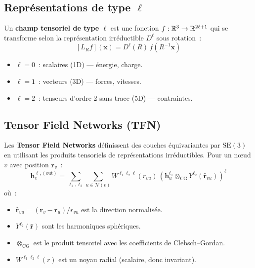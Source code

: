 \subsection{Repr\'esentations de type $\ell$}

\begin{definition}
Un \textbf{champ tensoriel de type $\ell$} est une fonction
$f: \mathbb{R}^3 \to \mathbb{R}^{2\ell+1}$ qui se transforme selon la repr\'esentation
irr\'eductible $D^\ell$ sous rotation~:
\[
    [L_R f](\mathbf{x}) = D^\ell(R)\, f(R^{-1}\mathbf{x})
\]
\begin{itemize}
    \item $\ell = 0$~: scalaires (1D) --- \'energie, charge.
    \item $\ell = 1$~: vecteurs (3D) --- forces, vitesses.
    \item $\ell = 2$~: tenseurs d'ordre 2 sans trace (5D) --- contraintes.
\end{itemize}
\end{definition}

\subsection{Tensor Field Networks (TFN)}

\begin{definition}
Les \textbf{Tensor Field Networks} d\'efinissent des couches \'equivariantes
par $\mathrm{SE}(3)$ en utilisant les produits tensoriels de repr\'esentations
irr\'eductibles. Pour un n\oe ud $v$ avec position $\mathbf{r}_v$~:
\[
    \mathbf{h}_v^{\ell, (\text{out})} = \sum_{\ell_1, \ell_2}
    \sum_{u \in \mathcal{N}(v)} W^{\ell_1 \ell_2 \ell}(r_{vu})\,
    \left(\mathbf{h}_u^{\ell_1} \otimes_{\text{CG}} Y^{\ell_2}(\hat{\mathbf{r}}_{vu})\right)^\ell
\]
o\`u~:
\begin{itemize}
    \item $\hat{\mathbf{r}}_{vu} = (\mathbf{r}_v - \mathbf{r}_u) / r_{vu}$ est
          la direction normalis\'ee.
    \item $Y^{\ell_2}(\hat{\mathbf{r}})$ sont les harmoniques sph\'eriques.
    \item $\otimes_{\text{CG}}$ est le produit tensoriel avec les coefficients
          de Clebsch--Gordan.
    \item $W^{\ell_1 \ell_2 \ell}(r)$ est un noyau radial (scalaire, donc invariant).
\end{itemize}
\end{definition}

